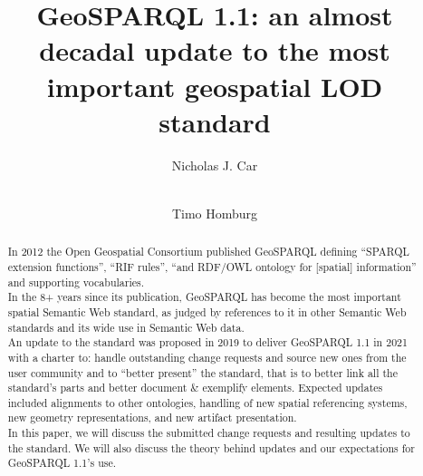 \documentclass[runningheads]{llncs}
\begin{document}
\title{GeoSPARQL 1.1: an almost decadal update to the most important geospatial LOD standard}

\author{
    Nicholas J. Car \and \\
    Timo Homburg\\
}



\maketitle

\begin{abstract}
In 2012 the Open Geospatial Consortium published GeoSPARQL 
defining ``SPARQL extension functions'', ``RIF rules'', ``and RDF/OWL ontology for 
[spatial] information'' and supporting vocabularies.\\

In the 8+ years since its publication, GeoSPARQL has become the most important spatial Semantic 
Web standard, as judged by references to it in other Semantic Web standards and its wide use in 
Semantic Web data.\\

An update to the standard was proposed in 2019 to deliver GeoSPARQL 1.1 in 2021 with a charter to: 
handle outstanding change requests and source new ones from the user community and 
to ``better present'' the standard, that is to better link all the standard’s parts and better 
document \& exemplify elements. Expected updates included alignments to other ontologies, 
handling of new spatial referencing systems, new geometry representations, and new artifact 
presentation.\\

In this paper, we will discuss the submitted change requests and resulting updates to the standard. 
We will also discuss the theory behind updates and our expectations for GeoSPARQL 1.1's use.

\end{abstract}
\end{document}
